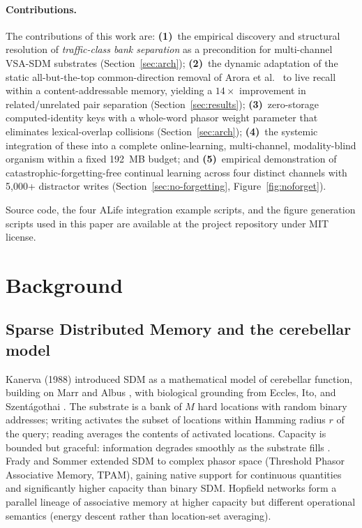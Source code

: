 \documentclass[11pt,a4paper]{article}
\begin{document}
\paragraph{Contributions.}  The contributions of this work are:
\textbf{(1)}~the empirical discovery and structural resolution of
\emph{traffic-class bank separation} as a precondition for multi-channel
VSA-SDM substrates (Section~\ref{sec:arch});
\textbf{(2)}~the dynamic adaptation of the static all-but-the-top
common-direction removal of Arora et al.\ \cite{mu2017all} to live recall
within a content-addressable memory, yielding a $14\times$ improvement in
related/unrelated pair separation (Section~\ref{sec:results});
\textbf{(3)}~zero-storage computed-identity keys with a whole-word phasor
weight parameter that eliminates lexical-overlap collisions
(Section~\ref{sec:arch});
\textbf{(4)}~the systemic integration of these into a complete
online-learning, multi-channel, modality-blind organism within a fixed
192~MB budget;  and
\textbf{(5)}~empirical demonstration of catastrophic-forgetting-free
continual learning across four distinct channels with 5,000+ distractor
writes (Section~\ref{sec:no-forgetting}, Figure~\ref{fig:noforget}).

Source code, the four ALife integration example scripts, and the figure
generation scripts used in this paper are available at the project
repository under MIT license.

\section{Background}
\label{sec:background}

\subsection{Sparse Distributed Memory and the cerebellar model}
Kanerva (1988) \cite{kanerva1988sparse} introduced SDM as a mathematical
model of cerebellar function, building on Marr \cite{marr1969cerebellum}
and Albus \cite{albus1971theory}, with biological grounding from
Eccles, Ito, and Szent\'agothai \cite{eccles1967cerebellum,ito2008control}.
The substrate is a bank of $M$ hard locations with random binary addresses;
writing activates the subset of locations within Hamming radius $r$ of the
query;  reading averages the contents of activated locations.  Capacity is
bounded but graceful: information degrades smoothly as the substrate fills
\cite{joglekar2015capacity}.  Frady and Sommer
\cite{frady2019robust} extended SDM to complex phasor space (Threshold
Phasor Associative Memory, TPAM), gaining native support for continuous
quantities and significantly higher capacity than binary SDM.  Hopfield
networks \cite{hopfield1982neural,krotov2016dense,ramsauer2020hopfield}
form a parallel lineage of associative memory at higher capacity but
different operational semantics (energy descent rather than location-set
averaging).
\end{document}
